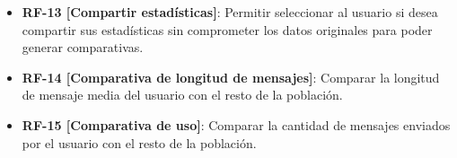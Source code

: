 
\begin{itemize}
    \item \textbf{RF-13 [Compartir estadísticas]}: Permitir seleccionar al usuario si desea compartir sus estadísticas sin comprometer los datos originales para poder generar comparativas.
    \item \textbf{RF-14 [Comparativa de longitud de mensajes]}: Comparar la longitud de mensaje media del usuario con el resto de la población.
    \item \textbf{RF-15 [Comparativa de uso]}: Comparar la cantidad de mensajes enviados por el usuario con el resto de la población.
\end{itemize}

